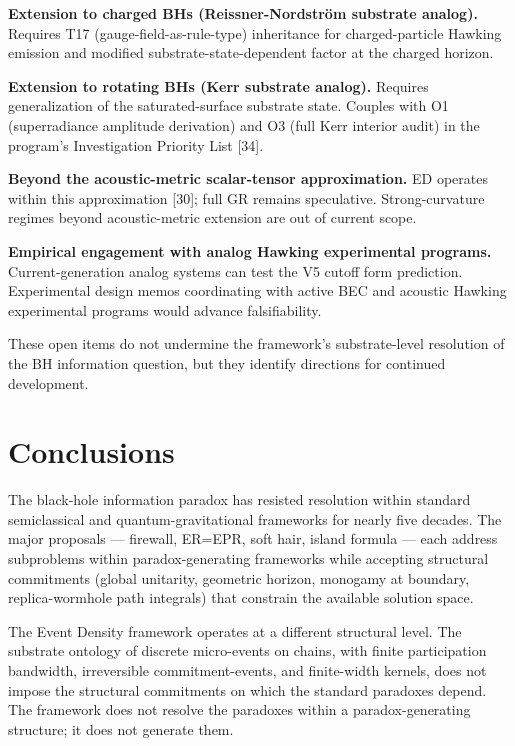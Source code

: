 \documentclass[11pt,a4paper]{article}
\begin{document}
\textbf{Extension to charged BHs (Reissner-Nordstr\"om substrate analog).} Requires T17 (gauge-field-as-rule-type) inheritance for charged-particle Hawking emission and modified substrate-state-dependent factor at the charged horizon.

\textbf{Extension to rotating BHs (Kerr substrate analog).} Requires generalization of the saturated-surface substrate state. Couples with O1 (superradiance amplitude derivation) and O3 (full Kerr interior audit) in the program's Investigation Priority List [34].

\textbf{Beyond the acoustic-metric scalar-tensor approximation.} ED operates within this approximation [30]; full GR remains speculative. Strong-curvature regimes beyond acoustic-metric extension are out of current scope.

\textbf{Empirical engagement with analog Hawking experimental programs.} Current-generation analog systems can test the V5 cutoff form prediction. Experimental design memos coordinating with active BEC and acoustic Hawking experimental programs would advance falsifiability.

These open items do not undermine the framework's substrate-level resolution of the BH information question, but they identify directions for continued development.

\section{Conclusions}

The black-hole information paradox has resisted resolution within standard semiclassical and quantum-gravitational frameworks for nearly five decades. The major proposals --- firewall, ER=EPR, soft hair, island formula --- each address subproblems within paradox-generating frameworks while accepting structural commitments (global unitarity, geometric horizon, monogamy at boundary, replica-wormhole path integrals) that constrain the available solution space.

The Event Density framework operates at a different structural level. The substrate ontology of discrete micro-events on chains, with finite participation bandwidth, irreversible commitment-events, and finite-width kernels, does not impose the structural commitments on which the standard paradoxes depend. The framework does not resolve the paradoxes within a paradox-generating structure; it does not generate them.
\end{document}
